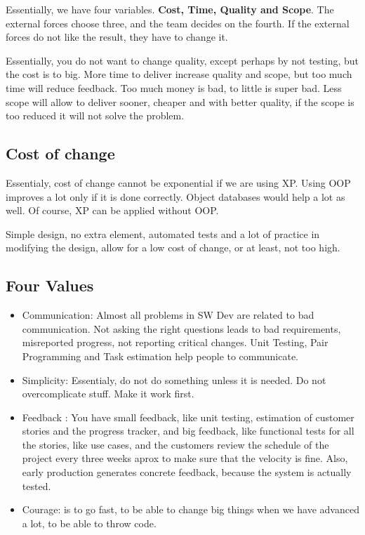 \documentclass[a4paper,12pt]{article}
\begin{document}
Essentially, we have four variables. \textbf{ Cost, Time, Quality and Scope}. The external forces choose three, and the team decides on the fourth. If the external forces do not like the result, they have to change it.

Essentially, you do not want to change quality, except perhaps by not testing, but the cost is to big. More time to deliver increase quality and scope, but too much time will reduce feedback. Too much money is bad, to little is super bad. Less scope will allow to deliver sooner, cheaper and with better quality, if the scope is too reduced it will not solve the problem.

\subsection{Cost of change}

Essentialy, cost of change cannot be exponential if we are using XP. Using OOP improves a lot only if it is done correctly. Object databases would help a lot as well. Of course, XP can be applied without OOP.

Simple design, no extra element, automated tests and a lot of practice in modifying the design, allow for a low cost of change, or at least, not too high.

\subsection{ Four Values}

\begin{itemize}
\item Communication: Almost all problems in SW Dev are related to bad communication. Not asking the right questions leads to bad requirements, misreported progress, not reporting critical changes. Unit Testing, Pair Programming and Task estimation help people to communicate.
  
\item Simplicity: Essentialy, do not do something unless it is needed. Do not overcomplicate stuff. Make it work first.
  
\item Feedback : You have small feedback, like unit testing, estimation of customer stories and the progress tracker, and big feedback, like functional tests for all the stories, like use cases, and the customers review the schedule of the project every three weeks aprox to make sure that the velocity is fine.  Also, early production generates concrete feedback, because the system is actually tested.
\item Courage: is to go fast, to be able to change big things when we have advanced a lot, to be able to throw code. 
\end{itemize}
\end{document}
